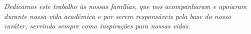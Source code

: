 \begin{dedicatoria}
   \vspace*{\fill}
   \centering
   \noindent
 \textit{
    	Dedicamos este trabalho às nossas famílias, que nos acompanharam e apoiaram durante nossa vida acadêmica
        e por serem responsáveis pela base do nosso caráter, servindo sempre como inspirações para nossas vidas. }\vspace*{\fill}
\end{dedicatoria}
